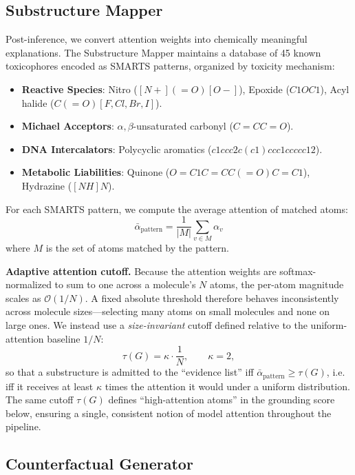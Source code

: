 \documentclass[conference]{IEEEtran}
\begin{document}
\subsection{Substructure Mapper}

Post-inference, we convert attention weights into chemically meaningful explanations. The Substructure Mapper maintains a database of 45 known toxicophores encoded as SMARTS patterns, organized by toxicity mechanism:

\begin{itemize}
    \item \textbf{Reactive Species}: Nitro ($[N+](=O)[O-]$), Epoxide ($C1OC1$), Acyl halide ($C(=O)[F,Cl,Br,I]$).
    \item \textbf{Michael Acceptors}: $\alpha,\beta$-unsaturated carbonyl ($C=CC=O$).
    \item \textbf{DNA Intercalators}: Polycyclic aromatics ($c1ccc2c(c1)ccc1ccccc12$).
    \item \textbf{Metabolic Liabilities}: Quinone ($O=C1C=CC(=O)C=C1$), Hydrazine ($[NH]N$).
\end{itemize}

For each SMARTS pattern, we compute the average attention of matched atoms:
\begin{equation}
    \bar{\alpha}_{\text{pattern}} = \frac{1}{|M|} \sum_{v \in M} \alpha_v
\end{equation}
where $M$ is the set of atoms matched by the pattern.

\textbf{Adaptive attention cutoff.} Because the attention weights are softmax-normalized to sum to one across a molecule's $N$ atoms, the per-atom magnitude scales as $\mathcal{O}(1/N)$. A fixed absolute threshold therefore behaves inconsistently across molecule sizes---selecting many atoms on small molecules and none on large ones. We instead use a \emph{size-invariant} cutoff defined relative to the uniform-attention baseline $1/N$:
\begin{equation}
    \tau(G) = \kappa \cdot \frac{1}{N}, \qquad \kappa = 2,
\end{equation}
so that a substructure is admitted to the ``evidence list'' iff $\bar{\alpha}_{\text{pattern}} \geq \tau(G)$, i.e. iff it receives at least $\kappa$ times the attention it would under a uniform distribution. The same cutoff $\tau(G)$ defines ``high-attention atoms'' in the grounding score below, ensuring a single, consistent notion of model attention throughout the pipeline.

\subsection{Counterfactual Generator}
\end{document}

